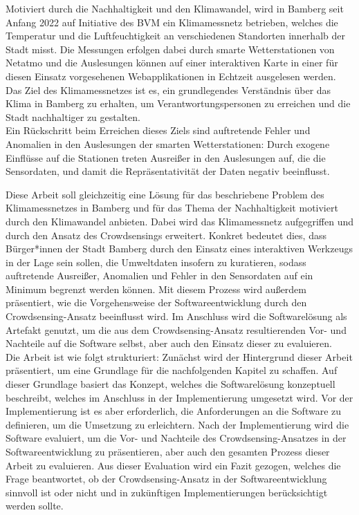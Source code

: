 Motiviert durch die Nachhaltigkeit und den Klimawandel, wird in Bamberg seit Anfang 2022 auf Initiative des \ac{BVM} ein Klimamessnetz betrieben, welches die Temperatur und die Luftfeuchtigkeit an verschiedenen Standorten innerhalb der Stadt misst. Die Messungen erfolgen dabei durch smarte Wetterstationen von Netatmo und die Auslesungen können auf einer interaktiven Karte in einer für diesen Einsatz vorgesehenen Webapplikationen in Echtzeit ausgelesen werden. Das Ziel des Klimamessnetzes ist es, ein grundlegendes Verständnis über das Klima in Bamberg zu erhalten, um Verantwortungspersonen zu erreichen und die Stadt nachhaltiger zu gestalten. \\ Ein Rückschritt beim Erreichen dieses Ziels sind auftretende Fehler und Anomalien in den Auslesungen der smarten Wetterstationen: Durch exogene Einflüsse auf die Stationen treten Ausreißer in den Auslesungen auf, die die Sensordaten, und damit die Repräsentativität der Daten negativ beeinflusst. 

Diese Arbeit soll gleichzeitig eine Lösung für das beschriebene Problem des Klimamessnetzes in Bamberg und für das Thema der Nachhaltigkeit motiviert durch den Klimawandel anbieten. Dabei wird das Klimamessnetz aufgegriffen und durch den Ansatz des Crowdsensings erweitert. Konkret bedeutet dies, dass Bürger*innen der Stadt Bamberg durch den Einsatz eines interaktiven Werkzeugs in der Lage sein sollen, die Umweltdaten insofern zu kuratieren, sodass auftretende Ausreißer, Anomalien und Fehler in den Sensordaten auf ein Minimum begrenzt werden können. Mit diesem Prozess wird außerdem präsentiert, wie die Vorgehensweise der Softwareentwicklung durch den Crowdsensing-Ansatz beeinflusst wird. Im Anschluss wird die Softwarelösung als Artefakt genutzt, um die aus dem Crowdsensing-Ansatz resultierenden Vor- und Nachteile auf die Software selbst, aber auch den Einsatz dieser zu evaluieren. \\ Die Arbeit ist wie folgt strukturiert: Zunächst wird der Hintergrund dieser Arbeit präsentiert, um eine Grundlage für die nachfolgenden Kapitel zu schaffen. Auf dieser Grundlage basiert das Konzept, welches die Softwarelösung konzeptuell beschreibt, welches im Anschluss in der Implementierung umgesetzt wird. Vor der Implementierung ist es aber erforderlich, die Anforderungen an die Software zu definieren, um die Umsetzung zu erleichtern. Nach der Implementierung wird die Software evaluiert, um die Vor- und Nachteile des Crowdsensing-Ansatzes in der Softwareentwicklung zu präsentieren, aber auch den gesamten Prozess dieser Arbeit zu evaluieren. Aus dieser Evaluation wird ein Fazit gezogen, welches die Frage beantwortet, ob der Crowdsensing-Ansatz in der Softwareentwicklung sinnvoll ist oder nicht und in zukünftigen Implementierungen berücksichtigt werden sollte. 